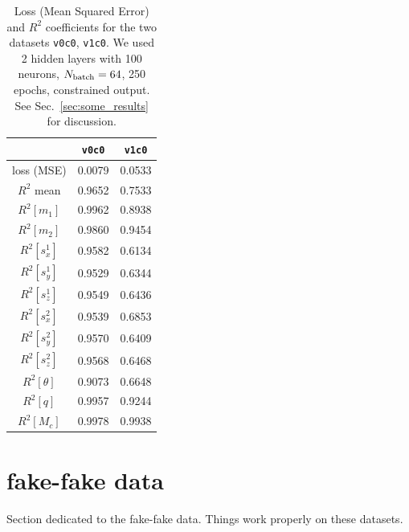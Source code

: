 \documentclass[prd,aps,twocolumn,a4paper,showkeys,nofootinbib]{revtex4-1}
\begin{document}
\begin{table}[t]
\caption{\label{tab:some_results} Loss (Mean Squared Error) and $R^2$ coefficients
 	for the two datasets \texttt{v0c0}, \texttt{v1c0}.
   	We used 2 hidden layers with 100 neurons, $N_{\rm batch}=64$, 250 epochs,  
   	constrained output. See Sec.~\ref{sec:some_results} for discussion.}
\begin{center}
\begin{tabular}{c | c | c} 
 & \texttt{v0c0} & \texttt{v1c0}  \\
\hline
\hline
loss (MSE)      & 0.0079 & 0.0533 \\
\hline
$R^2$ mean      & 0.9652 & 0.7533 \\
\hline
$R^2 [m_1   ]$  & 0.9962 & 0.8938 \\
$R^2 [m_2   ]$  & 0.9860 & 0.9454 \\
$R^2 [s^1_x ]$  & 0.9582 & 0.6134 \\
$R^2 [s^1_y ]$  & 0.9529 & 0.6344 \\
$R^2 [s^1_z ]$  & 0.9549 & 0.6436 \\
$R^2 [s^2_x ]$  & 0.9539 & 0.6853 \\
$R^2 [s^2_y ]$  & 0.9570 & 0.6409 \\
$R^2 [s^2_z ]$  & 0.9568 & 0.6468 \\
$R^2 [\theta]$  & 0.9073 & 0.6648 \\
$R^2 [q     ]$  & 0.9957 & 0.9244 \\
$R^2 [M_c   ]$  & 0.9978 & 0.9938 
\end{tabular}
\end{center}
\end{table}

\section{fake-fake data}
Section dedicated to the fake-fake data. Things work
properly on these datasets.

\end{document}
